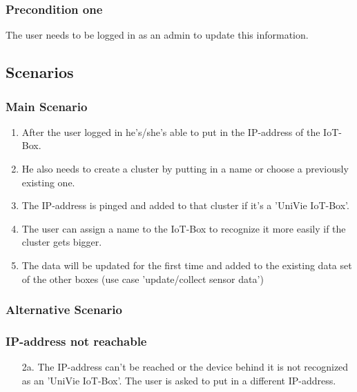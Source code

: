 \documentclass[notitlepage]{article}
\begin{document}
\subsubsection{Precondition one}
The user needs to be logged in as an admin to update this information.

\subsection{Scenarios}

\subsubsection{Main Scenario}
\begin{enumerate}
	
	\item After the user logged in he's/she's able to put in the IP-address of the IoT-Box.
	      
	\item He also needs to create a cluster by putting in a name or choose a previously existing one.
	      
	\item The IP-address is pinged and added to that cluster if it's a 'UniVie IoT-Box'.
	      
	\item The user can assign a name to the IoT-Box to recognize it more easily if the cluster gets bigger.
	      
	\item The data will be updated for the first time and added to the existing data set of the other boxes (use case 'update/collect sensor data')
	      
	      
\end{enumerate}

\subsubsection{Alternative Scenario}
\subsubsection*{IP-address not reachable}

\begin{enumerate}
	\item[2a.]{The IP-address can't be reached or the device behind it is not recognized as an 'UniVie IoT-Box'. The user is asked to put in a different IP-address.}
	      
\end{enumerate}
\end{document}
